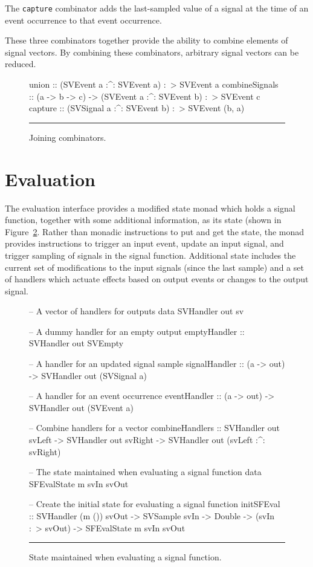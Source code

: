 The {\tt capture} combinator adds the last-sampled value of a signal at the time
of an event occurrence to that event occurrence.

These three combinators together provide the ability to combine elements of
signal vectors. By combining these combinators, arbitrary signal vectors can
be reduced.

\begin{figure}
\begin{code}
union          :: (SVEvent a :^: SVEvent a) :~> SVEvent a
combineSignals :: (a -> b -> c) -> (SVEvent a :^: SVEvent b) :~> SVEvent c
capture        :: (SVSignal a :^: SVEvent b) :~> SVEvent (b, a)
\end{code}
\hrule
\caption{Joining combinators.}
\label{figure:joining_combinators}
\end{figure}

\section{Evaluation}
\label{section:System_Design_and_Interface-Evaluator}

The evaluation interface provides a modified state monad which holds a signal
function, together with some additional information, as its state (shown in Figure~\ref{figure:evaluation_state}.
Rather than monadic instructions to put and get the state, the monad provides instructions
to trigger an input event, update an input signal, and trigger sampling of
signals in the signal function. Additional state includes the current set of
modifications to the input signals (since the last sample) and a set of
handlers which actuate effects based on output events or changes to the output
signal.

\begin{figure}
\begin{code}
-- A vector of handlers for outputs
data SVHandler out sv

-- A dummy handler for an empty output
emptyHandler    :: SVHandler out SVEmpty

-- A handler for an updated signal sample
signalHandler   :: (a -> out) -> SVHandler out (SVSignal a)

-- A handler for an event occurrence
eventHandler    :: (a -> out) -> SVHandler out (SVEvent a)

-- Combine handlers for a vector
combineHandlers ::    SVHandler out svLeft
                   -> SVHandler out svRight
                   -> SVHandler out (svLeft :^: svRight)

-- The state maintained when evaluating a signal function
data SFEvalState m svIn svOut

-- Create the initial state for evaluating a signal function
initSFEval ::    SVHandler (m ()) svOut
              -> SVSample svIn
              -> Double
              -> (svIn :~> svOut)
              -> SFEvalState m svIn svOut
\end{code}
\hrule
\caption{State maintained when evaluating a signal function.}
\label{figure:evaluation_state}
\end{figure}

